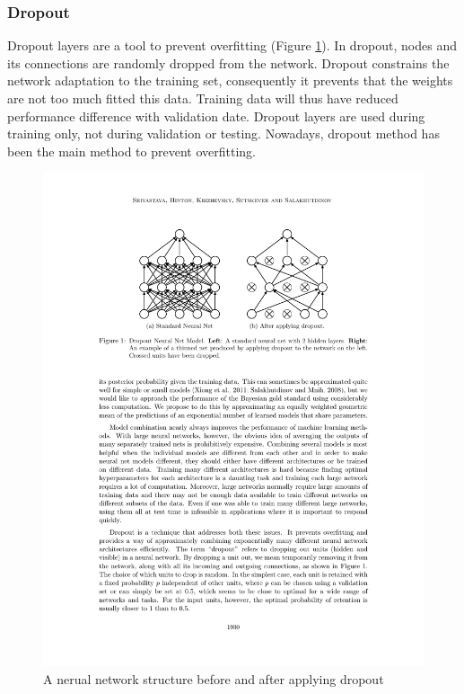     \subsubsection{Dropout}
    Dropout layers\cite{srivastava2014dropout} are a tool to prevent overfitting (Figure \ref{dropout}). In dropout, nodes and its connections are randomly dropped from the network. Dropout constrains the network adaptation to the training set, consequently it prevents that the weights are not too much fitted this data. Training data will thus have reduced performance difference with validation date. Dropout layers are used during training only, not during validation or testing. Nowadays, dropout method has been the main method to prevent overfitting.

    \begin{figure}[!h]
        \centering
        \includegraphics[scale=0.7]{Figures/dropout.pdf}
        \caption{A nerual network structure before and after applying dropout}
        \label{dropout}
    \end{figure}


